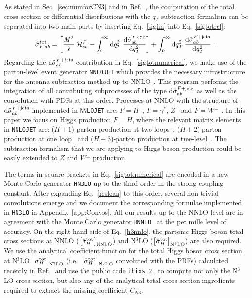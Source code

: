 \documentclass[12pt]{article}
\def\beeq{\begin{eqnarray}}
\def\eeeq{\end{eqnarray}}
\newcommand\f[2]{\frac{#1}{#2}}
\DeclareRobustCommand{\qt}{q_T}
\DeclareRobustCommand{\rd}{\ensuremath{\mathrm{d}}}
\begin{document}
As stated in Sec.~\ref{sec:numforCN3} and in Ref.~\cite{Catani:2007vq}, the computation of the total cross section or differential distributions with the  $\qt$ subtraction formalism can be separated into two main parts by inserting Eq.~\eqref{sigfin} into Eq.~\eqref{sigtotrel}:
\beeq
\label{sigtotnumerical} 
{\hat \sigma}_{F \,ab}^{{\rm {tot}}}
 = \left[\f{M^2}{\hat s} \;{\cal H}_{ab}^F - \int_0^{\infty} \rd\qt^2 \;
   \f{\rd{\hat \sigma}_{ab}^{F\;{\rm CT}}}{\rd \qt^2}\right]
+ \int_0^{\infty} \rd\qt^2 \;\f{\rd{\hat \sigma}_{ab}^{F+{\rm jets}}}{\rd \qt^2} \;\;.
\eeeq
Regarding the $\rd{\hat \sigma}_{ab}^{F+{\rm jets}}$ contribution in Eq.~\eqref{sigtotnumerical}, we make use of the parton-level event generator \texttt{NNLOJET} which provides the necessary infrastructure for the antenna subtraction method up to NNLO~\cite{Antenna:method}. This program performs the integration of all contributing subprocesses of the type  $\rd{\hat \sigma}_{ab}^{F+{\rm jets}}$ as well as the convolution with PDFs at this order. Processes at NNLO with the structure of $\rd{\hat \sigma}_{ab}^{F+{\rm jets}}$ implemented in \texttt{NNLOJET} are: $F=H$~\cite{Chen:2016zka}, $F=\gamma^*,~Z$~\cite{Ridder:2015dxa,Gehrmann-DeRidder:2016jns} and $F=W^{\pm}$~\cite{Gehrmann-DeRidder:2017mvr}. In this paper we focus on Higgs production $F=H$, where the relevant matrix elements in 
 \texttt{NNLOJET} are: ($H+1$)-parton production at two loops~\cite{Gehrmann:2011aa}, ($H+2$)-parton production at one loop~\cite{Dixon:2009uk,Badger:2009hw,Badger:2009vh} and ($H+3$)-parton 
 production at tree-level~\cite{DelDuca:2004wt,Dixon:2004za,Badger:2004ty}. The subtraction formalism that we are applying to Higgs boson production could be easily extended  to $Z$ and $W^{\pm}$ production. 

The terms in square brackets in Eq.~\eqref{sigtotnumerical}  are encoded in a new Monte Carlo generator \texttt{HN3LO} up to the third order in the strong coupling constant. After expanding Eq.~\eqref{reslean} to this order, several non-trivial convolutions emerge and we document the corresponding formulae implemented in \texttt{HN3LO} in Appendix~\ref{app:Convos}. All our results up to the NNLO level are in agreement with the Monte Carlo generator \texttt{HNNLO}~\cite{Catani:2007vq} at the per mille level of accuracy. On the right-hand side of Eq.~\eqref{h3nnlo}, the partonic Higgs boson total cross sections at NNLO ($\bigl[ {\hat \sigma}_{H}^{{\rm {tot}}} \bigr]_{\rm NNLO}$) and N$^{3}$LO  ($\bigl[ {\hat \sigma}_{H}^{{\rm {tot}}} \bigr]_{\rm N^{3}LO}$) are also required. We use the analytical coefficient function for the 
total Higgs boson cross section at N$^{3}$LO $\bigl[  \sigma_{H}^{{\rm {tot}}} \bigr]_{\rm N^{3}LO}$ (i.e.\ $\bigl[ {\hat \sigma}_{H}^{{\rm {tot}}} \bigr]_{\rm N^{3}LO}$ convoluted with the PDFs)  calculated recently in Ref.~\cite{Mistlberger:2018etf} and  use the public code \texttt{ihixs 2}~\cite{Dulat:2018rbf} to compute not only the N$^{3}$LO cross section, but also
 any of the analytical total cross-section ingredients required to extract the missing coefficient $C_{N3}$.
\end{document}

